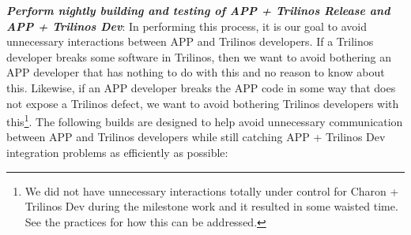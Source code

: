 \documentclass[pdf,ps2pdf,11pt]{SANDreport}
\begin{document}
{}\textit{\textbf{Perform nightly building and testing of APP + Trilinos
Release and APP + Trilinos Dev}}: In performing this process, it is our goal
to avoid unnecessary interactions between APP and Trilinos developers.  If a
Trilinos developer breaks some software in Trilinos, then we want to avoid
bothering an APP developer that has nothing to do with this and no reason to
know about this.  Likewise, if an APP developer breaks the APP code in some
way that does not expose a Trilinos defect, we want to avoid bothering
Trilinos developers with this\footnote{We did not have unnecessary
interactions totally under control for Charon + Trilinos Dev during the
milestone work and it resulted in some waisted time.  See the practices for
how this can be addressed.}.  The following builds are designed to help avoid
unnecessary communication between APP and Trilinos developers while still
catching APP + Trilinos Dev integration problems as efficiently as possible:
\end{document}
